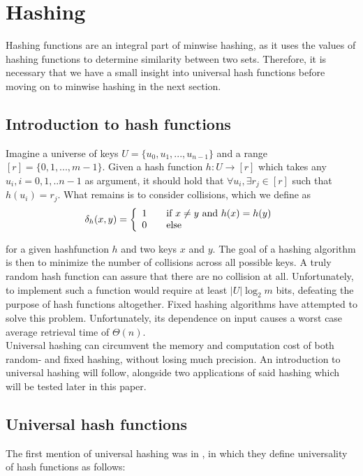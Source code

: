 \documentclass[../../main.tex]{subfiles}
\begin{document}
\section{Hashing}
Hashing functions are an integral part of minwise hashing, as it uses the values of hashing functions to determine similarity between two sets. Therefore, it is necessary that we have a small insight into universal hash functions before moving on to minwise hashing in the next section.

\subsection{Introduction to hash functions}
Imagine a universe of keys $U=\{u_{0},u_{1},...,u_{n-1}\}$ and a range $[r]=\{0,1,...,m-1\}$. Given a hash function $h:U\rightarrow [r]$ which takes any $u_i,i=0,1,..n-1$ as argument, it should hold that $\forall u_i,\exists r_j \in [r]$ such that $h(u_i)= r_j$. What remains is to consider collisions, which we define as
\begin{equation}\label{collision}
\delta_h(x,y) = \left\{ 
  \begin{array}{l l}
    1 & \quad \text{if $x\neq y$ and $h(x)=h(y)$}\\
    0 & \quad \text{else}
  \end{array} \right.
\end{equation}

for a given hashfunction $h$ and two keys $x$ and $y$. The goal of a hashing algorithm is then to minimize the number of collisions across all possible keys. A truly random hash function can assure that there are no collision at all. Unfortunately, to implement such a function would require at least $|U|\log_2 m$ bits\cite{dikuHash}, defeating the purpose of hash functions altogether. Fixed hashing algorithms have attempted to solve this problem. Unfortunately, its dependence on input causes a worst case average retrieval time of $\Theta(n)$.\cite{introToAlg}\\

Universal hashing can circumvent the memory and computation cost of both random- and fixed hashing, without losing much precision. An introduction to universal hashing will follow, alongside two applications of said hashing which will be tested later in this paper.

\subsection{Universal hash functions}
The first mention of universal hashing was in \cite{carterWegman}, in which they define universality of hash functions as follows:\\
\end{document}
